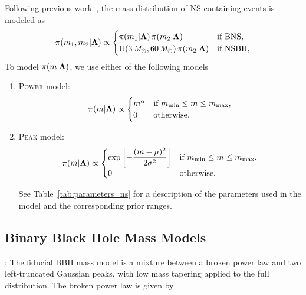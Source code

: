 \noindent Following previous work~\citep{Landry:2021hvl,KAGRA:2021duu},
the mass distribution of \ac{NS}-containing events is modeled as
\begin{equation}
\pi(m_1, m_2 | \boldsymbol{\Lambda}) \propto
\begin{cases}
\pi(m_1| \boldsymbol{\Lambda}) \, \pi(m_2| \boldsymbol{\Lambda}) & \text{if BNS,} \\
\mathrm{U}(3\,\mathit{M_\odot}, 60\,\mathit{M_\odot}) \, \pi(m_2 | \boldsymbol{\Lambda}) & \text{if NSBH},
\end{cases}
\end{equation}
To model $\pi(m|\boldsymbol{\Lambda})$, we use either of the following models
\begin{enumerate}
	\item \textsc{Power} model:
\begin{equation}
	\pi(m|\boldsymbol{\Lambda}) \propto
	\begin{cases}
		m^{\alpha} & \text{if } m_{\min} \leq m \leq m_{\max}, \\
		0 & \text{otherwise.}
	\end{cases}
\end{equation}

\item \textsc{Peak} model:
\begin{equation}
	\pi(m|\boldsymbol{\Lambda}) \propto
	\begin{cases}
		\exp\left[ -\dfrac{(m - \mu)^2}{2\sigma^2} \right] & \text{if } m_{\min} \leq m \leq m_{\max}, \\
		0 & \text{otherwise.}
	\end{cases}
\end{equation}

See Table~\ref{tab:parameters_ns} for a description of the parameters used in the model and the corresponding prior ranges.

\end{enumerate}


\subsection{Binary Black Hole Mass Models}\label{appendix:BrokenPLTwoPeaks}

\BrokenPLTwoPeaks : The fiducial \ac{BBH} mass model is a mixture between a broken power law and two left-truncated Gaussian peaks, with low mass tapering applied to the full distribution. The broken power law is given by

